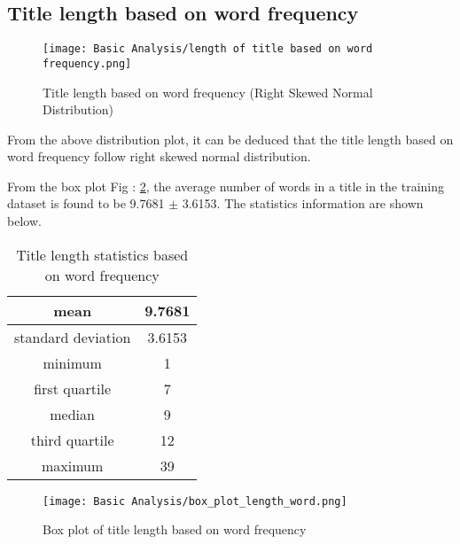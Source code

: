 \subsection{Title length based on word frequency}

\begin{figure}[H]
    \centering
    \texttt{[image: Basic Analysis/length of title based on word frequency.png]}
    \caption{Title length based on word frequency
    (Right Skewed Normal Distribution)}
    \label{fig:Title length based on word frequency}
\end{figure}

From the above distribution plot, it can be deduced that the title length based on word frequency follow right skewed normal distribution.

From the box plot Fig : \ref{fig:Box plot of title length based on word frequency}, the average number of words in a title in the training dataset is found to be 9.7681 $\pm$ 3.6153. The statistics information are shown below.

\begin{table}[H]
    \begin{center}
        \begin{tabular}{ |c|c| }
            \hline
            mean               & 9.7681 \\
            \hline
            standard deviation & 3.6153 \\
            \hline
            minimum            & 1       \\
            \hline
            first quartile     & 7      \\
            \hline
            median             & 9      \\
            \hline
            third quartile     & 12      \\
            \hline
            maximum            & 39     \\
            \hline
        \end{tabular}
    \end{center}
    \caption{Title length statistics based on word frequency}
    \label{table:Title length statistics based on word frequency}
\end{table}

\begin{figure}[H]
    \centering
    \texttt{[image: Basic Analysis/box\_plot\_length\_word.png]}
    \caption{Box plot of title length based on word frequency}
    \label{fig:Box plot of title length based on word frequency}
\end{figure}


